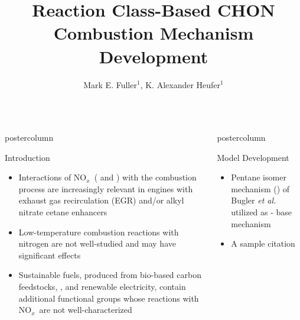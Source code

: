 \documentclass[final,hyperref={pdfpagelabels=false}]{beamer}
\title{\huge Reaction Class-Based {CHON} Combustion Mechanism Development}
\author{\LARGE Mark E. Fuller$^1$, K. Alexander Heufer$^1$}
\date{}
\institute{\Large $^1$Physico-Chemical Fundamentals of Combustion\\RWTH Aachen University}
\newcommand{\nox}{NO$_x$} %
\begin{document}
\begin{frame} %

	\begin{columns}[T] %
	\begin{column}{.48\textwidth}
		\begin{beamercolorbox}[center,wd=\textwidth]{postercolumn}
			\begin{block}{\LARGE Introduction}
				\begin{itemize}
					\item Interactions of \nox\ ( and ) with the combustion
process are increasingly relevant in engines with exhaust gas
recirculation (EGR) and/or alkyl nitrate cetane enhancers
					\item Low-temperature combustion reactions with nitrogen are not
well-studied and may have significant effects
					\item Sustainable fuels, produced from bio-based carbon
feedstocks,  , and renewable electricity, contain additional
functional groups whose reactions with \nox\ are not well-characterized
				\end{itemize}
			\end{block}
		\end{beamercolorbox}
	\end{column}
	\begin{column}{.48\textwidth}
		\begin{beamercolorbox}[center,wd=\textwidth]{postercolumn}
			\begin{block}{\LARGE Model Development}
				\begin{itemize}
					\item Pentane isomer mechanism () of Bugler {\it et al.} utilized as - base mechanism
					\item A sample citation\cite{Fuller.2014}
				\end{itemize}	
			\end{block}
		\end{beamercolorbox}
	\end{column}
\end{columns}


\end{frame}
\end{document}
